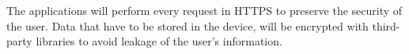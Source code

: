 The applications will perform every request in HTTPS to preserve the security of the user. 
Data that have to be stored in the device, will be encrypted with third-party libraries to avoid leakage of the user’s information.
